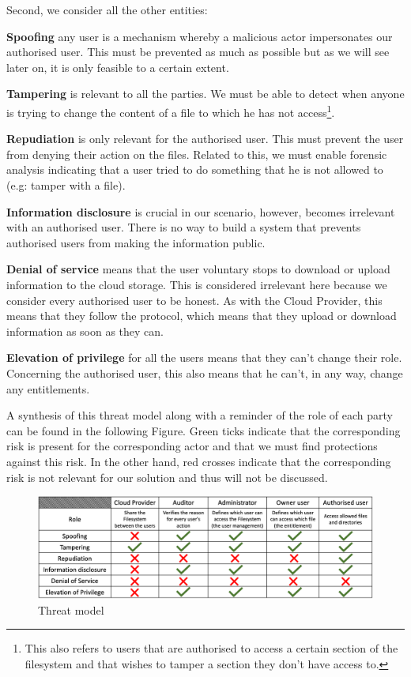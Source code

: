 \documentclass[../main.tex]{subfiles}
\begin{document}
\par Second, we consider all the other entities:
\par \textbf{Spoofing} any user is a mechanism whereby a malicious actor impersonates our authorised user. This must be prevented as much as possible but as we will see later on, it is only feasible to a certain extent.
\par \textbf{Tampering} is relevant to all the parties. We must be able to detect when anyone is trying to change the content of a file to which he has not access\footnote{This also refers to users that are authorised to access a certain section of the filesystem and that wishes to tamper a section they don't have access to.}.
\par \textbf{Repudiation} is only relevant for the authorised user. This must prevent the user from denying their action on the files. Related to this, we must enable forensic analysis indicating that a user tried to do something that he is not allowed to (e.g: tamper with a file).
\par \textbf{Information disclosure} is crucial in our scenario, however, becomes irrelevant with an authorised user. There is no way to build a system that prevents authorised users from making the information public.
\par \textbf{Denial of service} means that the user voluntary stops to download or upload information to the cloud storage. This is considered irrelevant here because we consider every authorised user to be honest. As with the Cloud Provider, this means that they follow the protocol, which means that they upload or download information as soon as they can.
\par \textbf{Elevation of privilege} for all the users means that they can't change their role. Concerning the authorised user, this also means that he can't, in any way, change any entitlements.

\medbreak
\par A synthesis of this threat model along with a reminder of the role of each party can be found in the following Figure. Green ticks indicate that the corresponding risk is present for the corresponding actor and that we must find protections against this risk. In the other hand, red crosses indicate that the corresponding risk is not relevant for our solution and thus will not be discussed.
\begin{figure}[h]
    \centering
    \includegraphics[width=\textwidth]{images/problem/threat_model}
    
    \caption{Threat model}
    \label{figure:problem:threat_model}
\end{figure}
\end{document}
